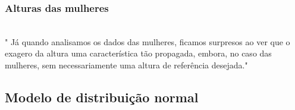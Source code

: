 \begin{frame}
\frametitle{Alturas das mulheres}

{
\pause
\justifying
{\footnotesize \\" Já quando analisamos os dados das mulheres, ficamos surpresos ao ver que o exagero da altura uma característica tão propagada, embora, no caso das mulheres, sem necessariamente uma altura de referência desejada."
}
}

\vfill
\justifying
{}

\end{frame}


\subsection{Modelo de distribuição normal}



